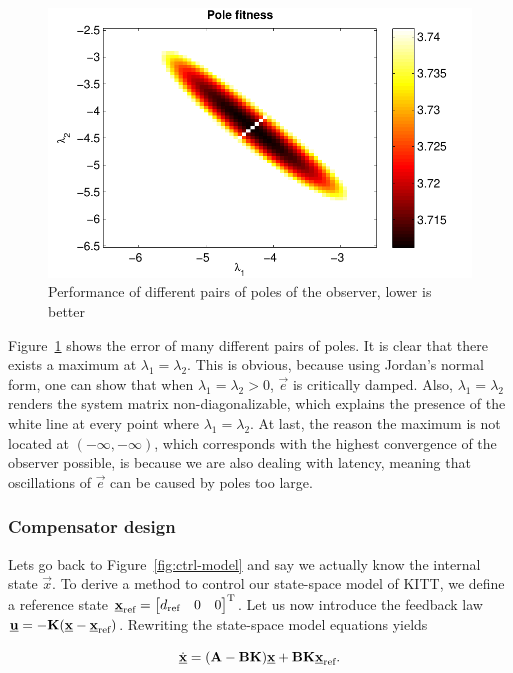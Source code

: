 \documentclass[11pt,titlepage]{report}
\begin{document}
\begin{figure}[H]
	\begin{center}
		\includegraphics[width=.7\linewidth]{resource/pole-fitness.pdf}
	\end{center}
	\caption{Performance of different pairs of poles of the observer, lower is better}
	\label{fig:ctrl-poles}
\end{figure}

Figure~\ref{fig:ctrl-poles} shows the error of many different pairs of poles. It is clear that there exists a maximum at $\lambda_1=\lambda_2$. This is obvious, because using Jordan's normal form, one can show that when $\lambda_1 = \lambda_2>0$, 
$\vec{e}$ is critically damped. Also, $\lambda_1 = \lambda_2$ renders the system matrix non-diagonalizable, which explains the presence of the white line at every point where $\lambda_1=\lambda_2$. At last, the reason the maximum is not located at $(-\infty,-\infty)$, which corresponds with the highest convergence of the observer possible, is because we are also dealing with latency, meaning that oscillations of $\vec{e}$ can be caused by poles too large.  

\subsubsection{Compensator design}
Lets go back to Figure~\ref{fig:ctrl-model} and say we actually know the internal state $\vec{x}$. To derive a method to control our state-space model of KITT, we define a reference state $\vec{x}_{\text{ref}} = \tr{\begin{bmatrix*}
	d_{\text{ref}} & 0 & 0 
\end{bmatrix*}}$. Let us now introduce the feedback law $\mathbf{\underline{u}} = -\mathbf{K}(\mathbf{\underline{x}}-\mathbf{\underline{x}}_{\text{ref}})$. Rewriting the state-space model equations yields

\begin{equation} \label{eq:ctrl-comp}
	\dot{\mathbf{\underline{x}}} = (\mathbf{A} - \mathbf{B} \mathbf{K}) \mathbf{\underline{x}} + \mathbf{B} \mathbf{K} \mathbf{\underline{x}}_{\text{ref}}.
\end{equation}
\end{document}
